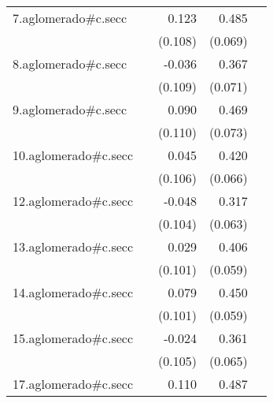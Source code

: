 {\begin{longtable}{l*{4}{D{.}{.}{-1}}}
\addlinespace
7.aglomerado#c.secc&                     &       0.123         &       0.485\sym{***}&                     \\
            &                     &     (0.108)         &     (0.069)         &                     \\
\addlinespace
8.aglomerado#c.secc&                     &      -0.036         &       0.367\sym{***}&                     \\
            &                     &     (0.109)         &     (0.071)         &                     \\
\addlinespace
9.aglomerado#c.secc&                     &       0.090         &       0.469\sym{***}&                     \\
            &                     &     (0.110)         &     (0.073)         &                     \\
\addlinespace
10.aglomerado#c.secc&                     &       0.045         &       0.420\sym{***}&                     \\
            &                     &     (0.106)         &     (0.066)         &                     \\
\addlinespace
12.aglomerado#c.secc&                     &      -0.048         &       0.317\sym{***}&                     \\
            &                     &     (0.104)         &     (0.063)         &                     \\
\addlinespace
13.aglomerado#c.secc&                     &       0.029         &       0.406\sym{***}&                     \\
            &                     &     (0.101)         &     (0.059)         &                     \\
\addlinespace
14.aglomerado#c.secc&                     &       0.079         &       0.450\sym{***}&                     \\
            &                     &     (0.101)         &     (0.059)         &                     \\
\addlinespace
15.aglomerado#c.secc&                     &      -0.024         &       0.361\sym{***}&                     \\
            &                     &     (0.105)         &     (0.065)         &                     \\
\addlinespace
17.aglomerado#c.secc&                     &       0.110         &       0.487\sym{***}&                     \\

\end{longtable}}
